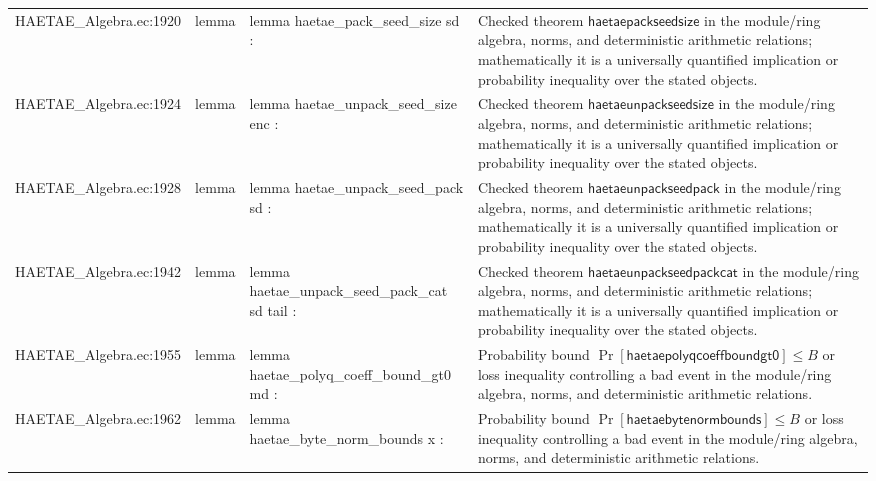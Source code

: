 \documentclass[10pt]{article}
\begin{document}
\begin{longtable}{L{0.11\textwidth}L{0.055\textwidth}L{0.385\textwidth}L{0.41\textwidth}}
HAETAE\_\allowbreak{}Algebra.\allowbreak{}ec:\allowbreak{}1920 & lemma & {\ttfamily\scriptsize lemma haetae\_\allowbreak{}pack\_\allowbreak{}seed\_\allowbreak{}size sd :} & Checked theorem $\mathsf{haetaepackseedsize}$ in the module/ring algebra, norms, and deterministic arithmetic relations; mathematically it is a universally quantified implication or probability inequality over the stated objects. \\
HAETAE\_\allowbreak{}Algebra.\allowbreak{}ec:\allowbreak{}1924 & lemma & {\ttfamily\scriptsize lemma haetae\_\allowbreak{}unpack\_\allowbreak{}seed\_\allowbreak{}size enc :} & Checked theorem $\mathsf{haetaeunpackseedsize}$ in the module/ring algebra, norms, and deterministic arithmetic relations; mathematically it is a universally quantified implication or probability inequality over the stated objects. \\
HAETAE\_\allowbreak{}Algebra.\allowbreak{}ec:\allowbreak{}1928 & lemma & {\ttfamily\scriptsize lemma haetae\_\allowbreak{}unpack\_\allowbreak{}seed\_\allowbreak{}pack sd :} & Checked theorem $\mathsf{haetaeunpackseedpack}$ in the module/ring algebra, norms, and deterministic arithmetic relations; mathematically it is a universally quantified implication or probability inequality over the stated objects. \\
HAETAE\_\allowbreak{}Algebra.\allowbreak{}ec:\allowbreak{}1942 & lemma & {\ttfamily\scriptsize lemma haetae\_\allowbreak{}unpack\_\allowbreak{}seed\_\allowbreak{}pack\_\allowbreak{}cat sd tail :} & Checked theorem $\mathsf{haetaeunpackseedpackcat}$ in the module/ring algebra, norms, and deterministic arithmetic relations; mathematically it is a universally quantified implication or probability inequality over the stated objects. \\
HAETAE\_\allowbreak{}Algebra.\allowbreak{}ec:\allowbreak{}1955 & lemma & {\ttfamily\scriptsize lemma haetae\_\allowbreak{}polyq\_\allowbreak{}coeff\_\allowbreak{}bound\_\allowbreak{}gt0 md :} & Probability bound $\Pr[\mathsf{haetaepolyqcoeffboundgt0}]\le B$ or loss inequality controlling a bad event in the module/ring algebra, norms, and deterministic arithmetic relations. \\
HAETAE\_\allowbreak{}Algebra.\allowbreak{}ec:\allowbreak{}1962 & lemma & {\ttfamily\scriptsize lemma haetae\_\allowbreak{}byte\_\allowbreak{}norm\_\allowbreak{}bounds x :} & Probability bound $\Pr[\mathsf{haetaebytenormbounds}]\le B$ or loss inequality controlling a bad event in the module/ring algebra, norms, and deterministic arithmetic relations. \\

\end{longtable}
\end{document}
